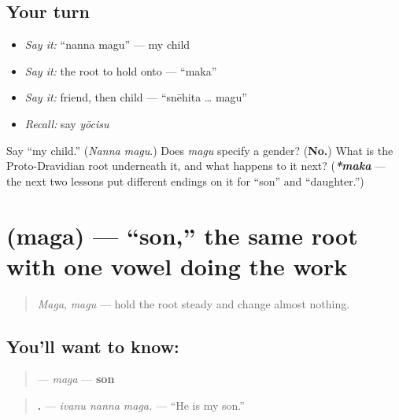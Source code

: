 \subsection*{Your turn}
\begin{itemize}
\raggedright
  \item \emph{Say it:} \textquotedblleft{}nanna magu\textquotedblright{} — my child
  \item \emph{Say it:} the root to hold onto — \textquotedblleft{}maka\textquotedblright{}
  \item \emph{Say it:} friend, then child — \textquotedblleft{}snēhita … magu\textquotedblright{}
  \item \emph{Recall:} say \emph{yōcisu}
\end{itemize}

\begin{tcolorbox}[breakable,colback=teal!4,colframe=teal!35!black,title={Before you move on}]
Say \textquotedblleft{}my child.\textquotedblright{} (\emph{Nanna magu}.) Does \emph{magu} specify a gender? (\textbf{No.}) What is the Proto-Dravidian root underneath it, and what happens to it next? (\emph{\textbf{*maka}} — the next two lessons put different endings on it for \textquotedblleft{}son\textquotedblright{} and \textquotedblleft{}daughter.\textquotedblright{})
\end{tcolorbox}
\section[\texorpdfstring{\kn{ಮಗ} (maga)}{ಮಗ (maga)}]{ (maga) — \textquotedblleft{}son,\textquotedblright{} the same root with one vowel doing the work}

\label{lesson:KA-C36-maga}



\begin{quote}
\emph{Maga}, \emph{magu} — hold the root steady and change almost nothing.
\end{quote}

\subsection*{You'll want to know: }
\begin{quote}
\textbf{} — \emph{maga} — \textbf{son}
\end{quote}

\begin{quote}
\textbf{  .} — \emph{ivanu nanna maga.} — \textquotedblleft{}He is my son.\textquotedblright{}
\end{quote}

